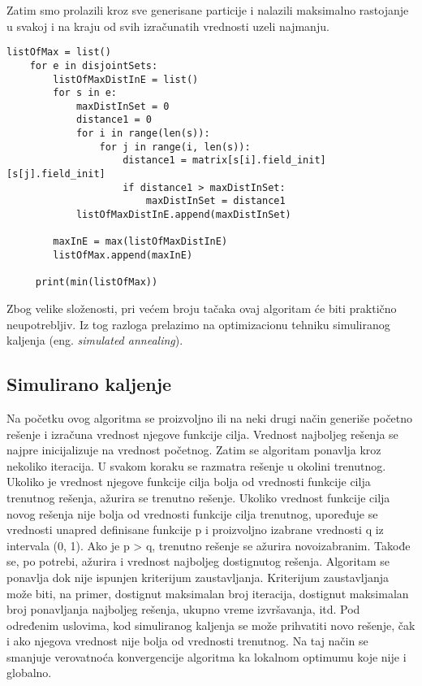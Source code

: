 \documentclass[a4paper]{article}
\begin{document}
Zatim smo prolazili kroz sve generisane particije i nalazili maksimalno rastojanje u svakoj i na kraju od svih izračunatih vrednosti uzeli najmanju. 

\begin{lstlisting}[title=Program 3: Nalaženje minimalnog rastojanja]
    listOfMax = list()
    for e in disjointSets:
        listOfMaxDistInE = list()
        for s in e:
            maxDistInSet = 0
            distance1 = 0
            for i in range(len(s)):
                for j in range(i, len(s)):
                    distance1 = matrix[s[i].field_init][s[j].field_init]
                    if distance1 > maxDistInSet:
                        maxDistInSet = distance1
            listOfMaxDistInE.append(maxDistInSet)

        maxInE = max(listOfMaxDistInE)
        listOfMax.append(maxInE)
        
     print(min(listOfMax))
\end{lstlisting}

Zbog velike složenosti, pri većem broju tačaka ovaj algoritam će biti praktično neupotrebljiv. Iz tog razloga prelazimo na optimizacionu tehniku simuliranog kaljenja (eng. \textit{simulated annealing}).\\


\subsection{Simulirano kaljenje}
Na početku ovog algoritma se proizvoljno ili na neki drugi način generiše početno rešenje i izračuna vrednost njegove funkcije cilja. Vrednost najboljeg rešenja se najpre inicijalizuje na vrednost početnog. Zatim se algoritam ponavlja kroz nekoliko iteracija. U svakom koraku se razmatra rešenje u okolini trenutnog. Ukoliko je vrednost njegove funkcije cilja bolja od vrednosti funkcije cilja trenutnog rešenja, ažurira se trenutno rešenje. Ukoliko vrednost funkcije cilja novog rešenja nije bolja od vrednosti funkcije cilja trenutnog, upoređuje se vrednosti unapred definisane funkcije p i proizvoljno izabrane vrednosti q iz intervala (0, 1). Ako je p > q, trenutno rešenje se ažurira novoizabranim. Takođe se, po potrebi, ažurira i vrednost najboljeg dostignutog rešenja. Algoritam se ponavlja dok nije ispunjen kriterijum zaustavljanja. Kriterijum zaustavljanja može biti, na primer, dostignut maksimalan broj iteracija, dostignut maksimalan broj ponavljanja najboljeg rešenja, ukupno vreme izvršavanja, itd. Pod određenim uslovima, kod simuliranog kaljenja se može prihvatiti novo rešenje, čak i ako njegova vrednost nije bolja od vrednosti trenutnog. Na taj način se smanjuje verovatnoća konvergencije algoritma ka lokalnom optimumu koje nije i globalno.\cite{miskovic} \\ 
\end{document}
